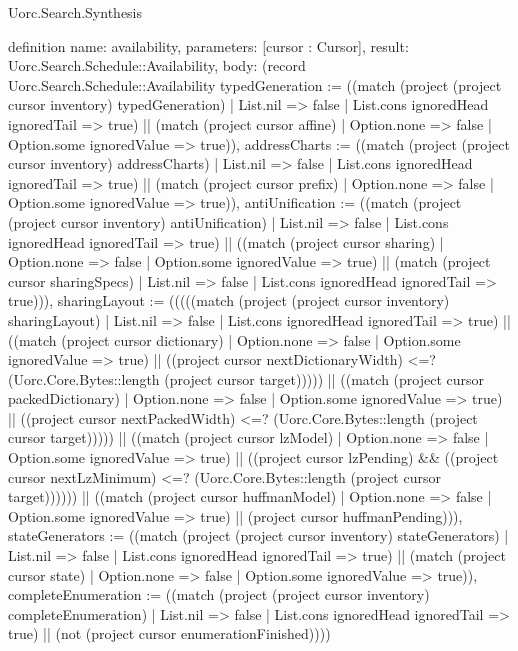 \begin{lexlean}{Uorc.Search.Synthesis}
\begin{semanticmodule}
definition{
  name: availability,
  parameters: [cursor : Cursor],
  result: Uorc.Search.Schedule::Availability,
  body: (record Uorc.Search.Schedule::Availability {typedGeneration := ((match (project (project cursor inventory) typedGeneration)
    | List.nil => false
    | List.cons ignoredHead ignoredTail => true) || (match (project cursor affine)
    | Option.none => false
    | Option.some ignoredValue => true)), addressCharts := ((match (project (project cursor inventory) addressCharts)
    | List.nil => false
    | List.cons ignoredHead ignoredTail => true) || (match (project cursor prefix)
    | Option.none => false
    | Option.some ignoredValue => true)), antiUnification := ((match (project (project cursor inventory) antiUnification)
    | List.nil => false
    | List.cons ignoredHead ignoredTail => true) || ((match (project cursor sharing)
    | Option.none => false
    | Option.some ignoredValue => true) || (match (project cursor sharingSpecs)
    | List.nil => false
    | List.cons ignoredHead ignoredTail => true))), sharingLayout := (((((match (project (project cursor inventory) sharingLayout)
    | List.nil => false
    | List.cons ignoredHead ignoredTail => true) || ((match (project cursor dictionary)
    | Option.none => false
    | Option.some ignoredValue => true) || ((project cursor nextDictionaryWidth) <=? (Uorc.Core.Bytes::length (project cursor target))))) || ((match (project cursor packedDictionary)
    | Option.none => false
    | Option.some ignoredValue => true) || ((project cursor nextPackedWidth) <=? (Uorc.Core.Bytes::length (project cursor target))))) || ((match (project cursor lzModel)
    | Option.none => false
    | Option.some ignoredValue => true) || ((project cursor lzPending) && ((project cursor nextLzMinimum) <=? (Uorc.Core.Bytes::length (project cursor target)))))) || ((match (project cursor huffmanModel)
    | Option.none => false
    | Option.some ignoredValue => true) || (project cursor huffmanPending))), stateGenerators := ((match (project (project cursor inventory) stateGenerators)
    | List.nil => false
    | List.cons ignoredHead ignoredTail => true) || (match (project cursor state)
    | Option.none => false
    | Option.some ignoredValue => true)), completeEnumeration := ((match (project (project cursor inventory) completeEnumeration)
    | List.nil => false
    | List.cons ignoredHead ignoredTail => true) || (not (project cursor enumerationFinished)))})
}


\end{semanticmodule}
\end{lexlean}
